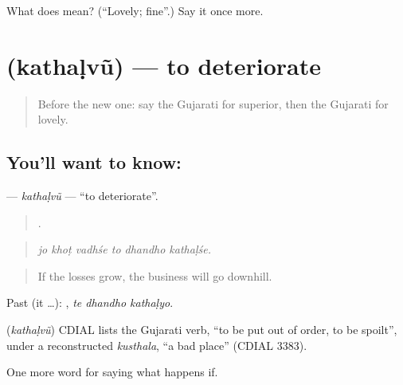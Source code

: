\begin{tcolorbox}[breakable,colback=teal!4,colframe=teal!35!black,title={Before you move on}]
What does  mean? (\textquotedblleft{}Lovely; fine\textquotedblright{}.) Say it once more.
\end{tcolorbox}
\section[\texorpdfstring{\gu{કથળવું} (kathaḷvũ)}{કથળવું (kathaḷvũ)}]{ (kathaḷvũ) — to deteriorate}

\label{lesson:GU-C387-kathalvu}



\begin{quote}
Before the new one: say the Gujarati for superior, then the Gujarati for lovely.
\end{quote}

\subsection*{You'll want to know: }
\textbf{} — \emph{kathaḷvũ} — \textquotedblleft{}to deteriorate\textquotedblright{}.

\begin{quote}
     .
\end{quote}

\begin{quote}
\emph{jo khoṭ vadhśe to dhandho kathaḷśe.}
\end{quote}

\begin{quote}
If the losses grow, the business will go downhill.
\end{quote}

Past (it …):   , \emph{te dhandho kathaḷyo}.

\begin{cousinweb}
\textbf{} (\emph{kathaḷvũ}) CDIAL lists the Gujarati verb, \textquotedblleft{}to be put out of order, to be spoilt\textquotedblright{}, under a reconstructed \emph{kusthala}, \textquotedblleft{}a bad place\textquotedblright{} (CDIAL 3383).
\end{cousinweb}

\begin{grammarlens}[title={What you've built}]
One more word for saying what happens if.
\end{grammarlens}

